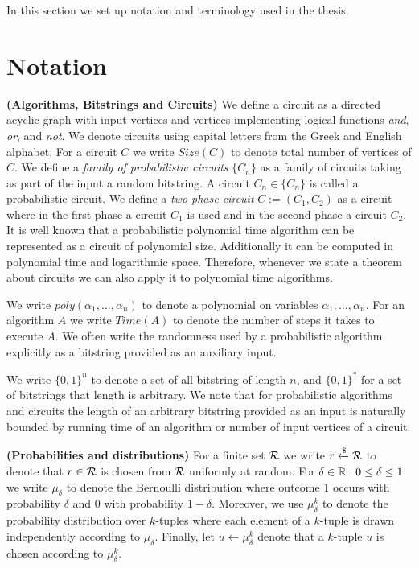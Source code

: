 In this section we set up notation and terminology used in the thesis.
%
\section{Notation}
\textbf{(Algorithms, Bitstrings and Circuits)}
We define a circuit as a directed acyclic graph with input vertices and vertices implementing logical functions \textit{and}, \textit{or}, and \textit{not}.
We denote circuits using capital letters from the Greek and English alphabet.
For a circuit $C$ we write $\mathit{Size}(C)$ to denote total number of vertices of $C$.
We define a \textit{family of probabilistic circuits} $\{C_n\}$ as a family of circuits taking as part of the input a random bitstring.
A circuit $C_n \in \{C_n\}$ is called a probabilistic circuit.
We define a \textit{two phase circuit} $C := (C_1, C_2)$ as a circuit where in the first phase a circuit $C_1$
is used and in the second phase a circuit $C_2$.
It is well known \cite{Arora:2009:CCM:1540612} that a probabilistic polynomial time algorithm can be represented as a circuit of polynomial size.
Additionally it can be computed in polynomial time and logarithmic space. Therefore, whenever we state a theorem about
circuits we can also apply it to polynomial time algorithms.

We write $\mathit{poly}(\alpha_1, \dots, \alpha_n)$ to denote a polynomial on variables $\alpha_1, \dots, \alpha_n$.
For an algorithm $A$ we write $\mathit{Time}(A)$ to denote the number of steps it takes to execute $A$.
We often write the randomness used by a probabilistic algorithm explicitly as a bitstring provided as an auxiliary input.

We write $\{0,1\}^{n}$ to denote a set of all bitstring of length $n$, and $\{0,1\}^{*}$ for a set of bitstrings that length is arbitrary.
We note that for probabilistic algorithms and circuits the length of an arbitrary bitstring provided as an input is naturally bounded by
running time of an algorithm or number of input vertices of a circuit.

\textbf{(Probabilities and distributions)}
For a finite set $\mathcal{R}$ we write $r \xleftarrow{\$} \mathcal{R}$ to denote that $r \in \mathcal{R}$ is chosen from $\mathcal{R}$ uniformly at random.
For $\delta \in \mathbb{R} : 0 \leq \delta \leq 1$ we write $\mu_{\delta}$ to denote the Bernoulli distribution where outcome $1$ occurs with
probability $\delta$ and $0$ with probability $1-\delta$.
Moreover, we use $\mu_{\delta}^k$ to denote the probability distribution over $k$-tuples
where each element of a $k$-tuple is drawn independently according to $\mu_{\delta}$.
Finally, let $u \leftarrow \mu_{\delta}^k$ denote that a $k$-tuple $u$ is chosen according to $\mu_{\delta}^k$.

